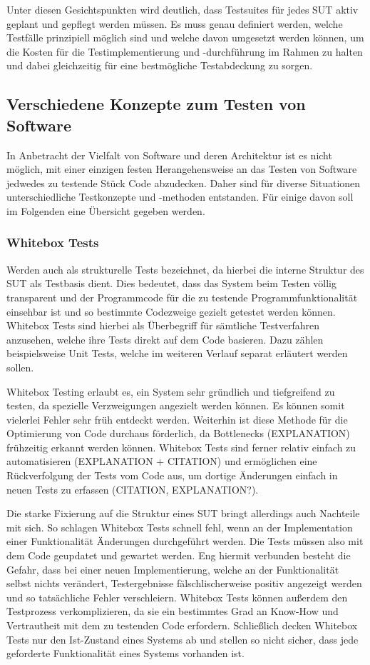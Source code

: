 Unter diesen Gesichtspunkten wird deutlich, dass Testsuites für jedes \ac{SUT} aktiv geplant und gepflegt werden müssen. Es muss genau definiert werden, welche Testfälle prinzipiell möglich sind und welche davon umgesetzt werden können, um die Kosten für die Testimplementierung und -durchführung im Rahmen zu halten und dabei gleichzeitig für eine bestmögliche Testabdeckung zu sorgen.

\subsection{Verschiedene Konzepte zum Testen von Software}\label{subsec:testkonzepte}
In Anbetracht der Vielfalt von Software und deren Architektur ist es nicht möglich, mit einer einzigen festen Herangehensweise an das Testen von Software jedwedes zu testende Stück Code abzudecken. Daher sind für diverse Situationen unterschiedliche Testkonzepte und -methoden entstanden. Für einige davon soll im Folgenden eine Übersicht gegeben werden.

\subsubsection*{Whitebox Tests}\label{subsubsec:whitebox}
Werden auch als strukturelle Tests bezeichnet, da hierbei die interne Struktur des \ac{SUT} als Testbasis dient. Dies bedeutet, dass das System beim Testen völlig transparent und der Programmcode für die zu testende Programmfunktionalität einsehbar ist und so bestimmte Codezweige gezielt getestet werden können. Whitebox Tests sind hierbei als Überbegriff für sämtliche Testverfahren anzusehen, welche ihre Tests direkt auf dem Code basieren. Dazu zählen beispielsweise Unit Tests, welche im weiteren Verlauf separat erläutert werden sollen.

Whitebox Testing erlaubt es, ein System sehr gründlich und tiefgreifend zu testen, da spezielle Verzweigungen angezielt werden können. Es können somit vielerlei Fehler sehr früh entdeckt werden. Weiterhin ist diese Methode für die Optimierung von Code durchaus förderlich, da Bottlenecks (EXPLANATION) frühzeitig erkannt werden können. Whitebox Tests sind ferner relativ einfach zu automatisieren (EXPLANATION + CITATION) und ermöglichen eine Rückverfolgung der Tests vom Code aus, um dortige Änderungen einfach in neuen Tests zu erfassen (CITATION, EXPLANATION?).

Die starke Fixierung auf die Struktur eines \ac*{SUT} bringt allerdings auch Nachteile mit sich. So schlagen Whitebox Tests schnell fehl, wenn an der Implementation einer Funktionalität Änderungen durchgeführt werden. Die Tests müssen also mit dem Code geupdatet und gewartet werden. Eng hiermit verbunden besteht die Gefahr, dass bei einer neuen Implementierung, welche an der Funktionalität selbst nichts verändert, Testergebnisse fälschlischerweise positiv angezeigt werden und so tatsächliche Fehler verschleiern. Whitebox Tests können außerdem den Testprozess verkomplizieren, da sie ein bestimmtes Grad an Know-How und Vertrautheit mit dem zu testenden Code erfordern. Schließlich decken Whitebox Tests nur den Ist-Zustand eines Systems ab und stellen so nicht sicher, dass jede geforderte Funktionalität eines Systems vorhanden ist.

